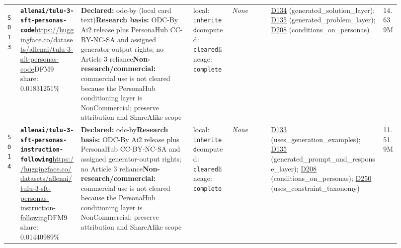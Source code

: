 \documentclass[9pt,a4paper]{article}
\newcommand{\srcid}[1]{\hypertarget{src:#1}{\texttt{#1}}}
\begin{document}
\begin{landscape}
\begin{longtable}{@{}L{0.03\linewidth}L{0.14\linewidth}L{0.26\linewidth}L{0.09\linewidth}L{0.09\linewidth}L{0.265\linewidth}L{0.045\linewidth}@{}}
\srcid{S013} & \textbf{\nolinkurl{allenai/tulu-3-sft-personas-code}}\newline \url{https://huggingface.co/datasets/allenai/tulu-3-sft-personas-code}\newline DFM9 share: 0.01831251\% & \textbf{Declared:} odc-by (local card text)\newline \textbf{Research basis:} ODC-By Ai2 release plus PersonaHub CC-BY-NC-SA and assigned generator-output rights; no Article 3 reliance\newline \textbf{Non-research/commercial:} commercial use is not cleared because the PersonaHub conditioning layer is NonCommercial; preserve attribution and ShareAlike scope & local: \texttt{inherited}\newline computed: \texttt{cleared}\newline lineage: \texttt{complete} & \textit{None} & \hyperlink{dep:D134}{D134} (generated\_solution\_layer); \hyperlink{dep:D135}{D135} (generated\_problem\_layer); \hyperlink{dep:D208}{D208} (conditions\_on\_personas) & 14.639M \\
\srcid{S014} & \textbf{\nolinkurl{allenai/tulu-3-sft-personas-instruction-following}}\newline \url{https://huggingface.co/datasets/allenai/tulu-3-sft-personas-instruction-following}\newline DFM9 share: 0.01440989\% & \textbf{Declared:} odc-by\newline \textbf{Research basis:} ODC-By Ai2 release plus PersonaHub CC-BY-NC-SA and assigned generator-output rights; no Article 3 reliance\newline \textbf{Non-research/commercial:} commercial use is not cleared because the PersonaHub conditioning layer is NonCommercial; preserve attribution and ShareAlike scope & local: \texttt{inherited}\newline computed: \texttt{cleared}\newline lineage: \texttt{complete} & \textit{None} & \hyperlink{dep:D133}{D133} (uses\_generation\_examples); \hyperlink{dep:D135}{D135} (generated\_prompt\_and\_response\_layer); \hyperlink{dep:D208}{D208} (conditions\_on\_personas); \hyperlink{dep:D250}{D250} (uses\_constraint\_taxonomy) & 11.519M \\

\end{longtable}
\end{landscape}
\end{document}
